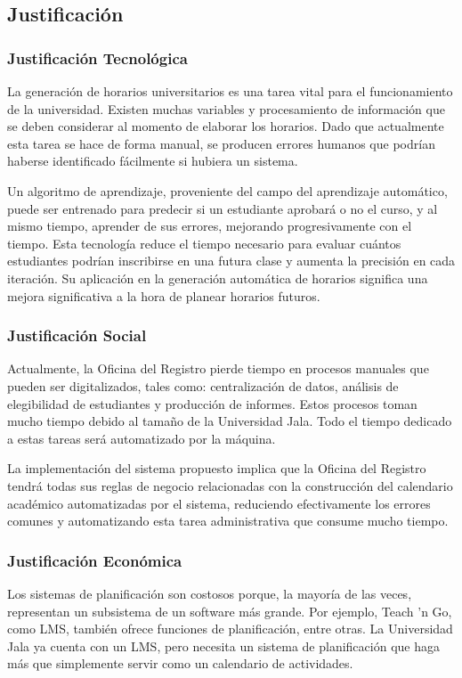 \subsection{Justificación}

\subsubsection{Justificación Tecnológica}
La generación de horarios universitarios es una tarea vital para el funcionamiento de la universidad. Existen muchas variables y procesamiento de información que se deben considerar al momento de elaborar los horarios. Dado que actualmente esta tarea se hace de forma manual, se producen errores humanos que podrían haberse identificado fácilmente si hubiera un sistema.

Un algoritmo de aprendizaje, proveniente del campo del aprendizaje automático, puede ser entrenado para predecir si un estudiante aprobará o no el curso, y al mismo tiempo, aprender de sus errores, mejorando progresivamente con el tiempo. Esta tecnología reduce el tiempo necesario para evaluar cuántos estudiantes podrían inscribirse en una futura clase y aumenta la precisión en cada iteración. Su aplicación en la generación automática de horarios significa una mejora significativa a la hora de planear horarios futuros.

\subsubsection{Justificación Social}

Actualmente, la Oficina del Registro pierde tiempo en procesos manuales que pueden ser digitalizados, tales como: centralización de datos, análisis de elegibilidad de estudiantes y producción de informes. Estos procesos toman mucho tiempo debido al tamaño de la Universidad Jala. Todo el tiempo dedicado a estas tareas será automatizado por la máquina.

La implementación del sistema propuesto implica que la Oficina del Registro tendrá todas sus reglas de negocio relacionadas con la construcción del calendario académico automatizadas por el sistema, reduciendo efectivamente los errores comunes y automatizando esta tarea administrativa que consume mucho tiempo.

\subsubsection{Justificación Económica}
Los sistemas de planificación son costosos porque, la mayoría de las veces, representan un subsistema de un software más grande. Por ejemplo, Teach 'n Go, como LMS, también ofrece funciones de planificación, entre otras. La Universidad Jala ya cuenta con un LMS, pero necesita un sistema de planificación que haga más que simplemente servir como un calendario de actividades.

